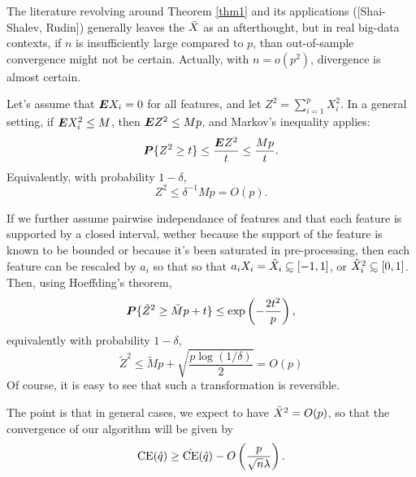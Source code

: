 \documentclass[11pt]{article}
\begin{document}
The literature revolving around Theorem \ref{thm1} and its applications ([Shai-Shalev,
Rudin]) generally leaves the $\bar X$ as an afterthought, but in real big-data contexts, if
$n$ is insufficiently large compared to $p$, than out-of-sample convergence might not be
certain. Actually, with $n=o(p^2)$, divergence is almost certain. 

Let's assume that $\bm E X_i = 0$ for all features, and let $Z^2 = \sum_{i=1}^p X_i^2$. In a
general setting, if $\bm E X_i^2 \leq M$, then $\bm E Z^2 \leq Mp$, and Markov's inequality
applies:
\[
  \bm P\{Z^2 \geq t\} \leq \frac{\bm E Z^2}{t} \leq \frac{Mp}{t}.
\]
Equivalently, with probability $1-\delta$, 
\[
  Z^2 \leq \delta^{-1}Mp = O(p).
\]

If we further assume pairwise independance of features and that each feature is supported
by a closed interval, wether because the support of the feature is known to be bounded or
because it's been saturated in pre-processing, then each feature can be rescaled by $a_i$
so that so that $a_iX_i = \tilde X_i \subsetsim[-1,1]$, or $\tilde X_i^2
\subsetsim[0,1]$. Then, using Hoeffding's theorem,
\[
  \bm P\{\tilde Z^2 \geq \tilde Mp + t\} \leq \exp\left(-\frac{2t^2}{p}\right),
\]
equivalently with probability $1-\delta$, 
\[
  \tilde Z^2 \leq \tilde Mp + \sqrt{\frac{p\log(1/\delta)}{2}} = O(p)
\]
Of course, it is easy to see that such a transformation is reversible. 

The point is that in general cases, we expect to have $\bar X^2 =O(p)$, so that the
convergence of our algorithm will be given by 
\[
  \operatorname{CE}(\hat q) \geq \hat{\operatorname{CE}}(\hat q) - O\left(\frac{p}{\sqrt{n}\lambda}\right).
\]




\printbibliography
\end{document}
